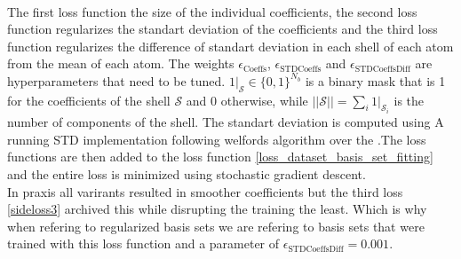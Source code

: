 {\begin{align}
 \end{align}
The first loss function the size of the individual coefficients, the second loss function regularizes the standart deviation of the coefficients and the third loss function regularizes the difference of standart deviation in each shell of each atom from the mean of each atom. The weights $\epsilon_\text{Coeffs}$, $\epsilon_\text{STDCoeffs}$ and $\epsilon_\text{STDCoeffsDiff}$ are hyperparameters that need to be tuned. $1|_{\mathcal{S}}\in \{0,1\}^{N_b}$ is a binary mask that is 1 for the coefficients of the shell $\mathcal{S}$ and 0 otherwise, while $||\mathcal{S}|| = \sum_i 1|_{\mathcal{S}}_i$ is the number of components of the shell. The standart deviation is computed using A running STD implementation following welfords algorithm\cite{welford1962} over the .The loss functions are then added to the loss function \eqref{loss_dataset_basis_set_fitting} and the entire loss is minimized using stochastic gradient descent. \\In praxis all varirants resulted in smoother coefficients but the third loss \eqref{sideloss3} archived this while disrupting the training the least. Which is why when refering to regularized basis sets we are refering to basis sets that were trained with this loss function and a parameter of $\epsilon_\text{STDCoeffsDiff}=0.001$.\\


}
